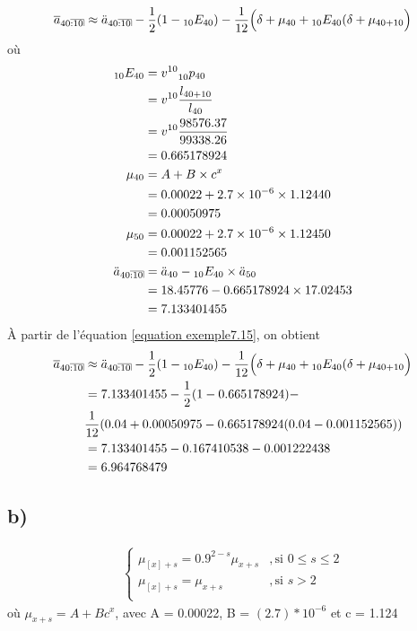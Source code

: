 \documentclass[11pt,french]{report}
\makeatletter
\DeclareRobustCommand{\annuity}[1]{%
\def\arraystretch{0}%
\setlength\arraycolsep{.7pt}%
\setlength\arrayrulewidth{.3pt}%
\begin{array}[b]{@{}c|}\hline
\\[\arraycolsep]%
\scriptstyle #1%
\end{array}%
}
\newcommand{\indiceGauche}[2]{{\vphantom{#2}}_{#1}#2}
\makeatother
\begin{document}
\begin{equation}
\label{equation exemple7.15}
\overline{a}_{40\annuity{:10}} \approx \ddot{a}_{40\annuity{:10}} - \frac{1}{2} (1 - \indiceGauche{10}{E}_{40}) - \frac{1}{12}\Big( \delta + \mu _{40} + \indiceGauche{10}{E}_{40}(\delta + \mu_{40+10} \Big)
\end{equation}
où
\begin{align*}
\indiceGauche{10}{E}_{40} &= v^{10} \indiceGauche{10}{p}_{40} \\
&= v^{10} \frac{l_{40 + 10}}{l_{40}} \\
&= v^{10} \frac{98576.37}{99338.26}  \\
&= 0.665178924 \\
\mu _{40} & = A + B \times c^x \\
&= 0.00022 + 2.7 \times 10^{-6} \times 1.124 {40} \\
&= 0.00050975 \\
\mu _{50} & = 0.00022 + 2.7 \times 10^{-6} \times 1.124 {50} \\
&= 0.001152565 \\
\ddot{a}_{40\annuity{:10}} &= \ddot{a}_{40} - \indiceGauche{10}{E}_{40} \times \ddot{a}_{50} \\
&=  18.45776 - 0.665178924 \times 17.02453 \\
&= 7.133401455
\end{align*}
À partir de l'équation \ref{equation exemple7.15}, on obtient
\begin{align*}
\overline{a}_{40\annuity{:10}} & \approx \ddot{a}_{40\annuity{:10}} - \frac{1}{2} (1 - \indiceGauche{10}{E}_{40}) - \frac{1}{12}\Big( \delta + \mu_{40} + \indiceGauche{10}{E}_{40}(\delta + \mu_{40+10} \Big) \\
&= 7.133401455 - \frac{1}{2}(1 - 0.665178924)- \\
& \frac{1}{12}(0.04 + 0.00050975 - 0.665178924(0.04-0.001152565)) \\
&= 7.133401455 - 0.167410538 - 0.001222438 \\
&= 6.964768479
\end{align*}
\subsection*{b)}

\begin{align*}
\left\{
     	\begin{array}{rl}
     	\mu_{[x]+s} = 0.9 ^{2-s}\mu_{x+s}   &, \text{si } 0 \leq s \leq 2 \\
			\mu_{[x]+s} = \mu_{x+s}   &, \text{si } s > 2 \\
     	\end{array}
     	\right.	
\end{align*}
où $\mu_{x+s} = A + Bc^x$, avec A = 0.00022, B = $(2.7)*10^{-6}$ et c = 1.124
\end{document}
